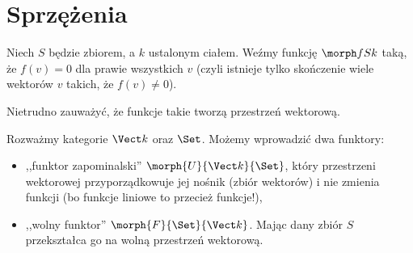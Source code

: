 \section{Sprzężenia}
\begin{noth}
  Niech $S$ będzie zbiorem, a $k$ ustalonym ciałem. Weźmy funkcję $\morph f Sk$ taką, że $f(v) = 0$ dla prawie wszystkich $v$ (czyli istnieje tylko skończenie wiele wektorów $v$ takich, że $f(v)\neq 0$).

  Nietrudno zauważyć, że funkcje takie tworzą przestrzeń wektorową.
\end{noth}

\begin{exmp}
  Rozważmy kategorie $\Vect k$ oraz $\Set$. Możemy wprowadzić dwa funktory:
  \begin{itemize}
    \item ,,funktor zapominalski'' $\morph{U}{\Vect k}{\Set}$, który przestrzeni wektorowej przyporządkowuje jej nośnik (zbiór wektorów) i nie zmienia funkcji (bo funkcje liniowe to przecież funkcje!),
    \item ,,wolny funktor'' $\morph{F}{\Set}{\Vect k}$. Mając dany zbiór $S$ przekształca go na wolną przestrzeń wektorową.
  \end{itemize}
\end{exmp}
